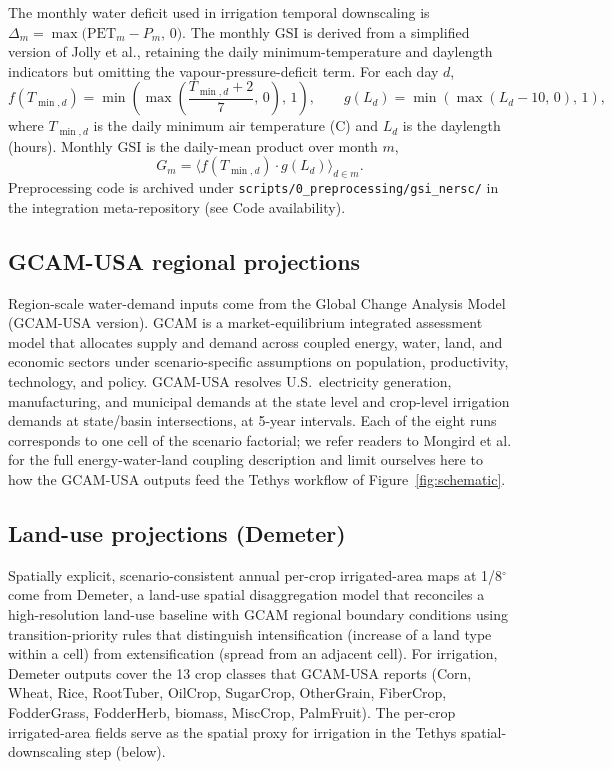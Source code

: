 \documentclass[fleqn,10pt]{wlscirep}
\begin{document}
The monthly water deficit used in irrigation temporal downscaling is $\Delta_m = \max\!\big(\text{PET}_m - P_m,\, 0\big)$. The monthly GSI is derived from a simplified version of Jolly et al.\cite{Jolly_2005}, retaining the daily minimum-temperature and daylength indicators but omitting the vapour-pressure-deficit term. For each day $d$,
\begin{equation}
f(T_{\min,d}) = \min\!\left(\max\!\left(\frac{T_{\min,d}+2}{7},\,0\right),\,1\right), \qquad
g(L_d) = \min\!\left(\max\!\left(L_d - 10,\,0\right),\,1\right),
\label{eq:gsi-components}
\end{equation}
where $T_{\min,d}$ is the daily minimum air temperature (\textdegree C) and $L_d$ is the daylength (hours). Monthly GSI is the daily-mean product over month $m$,
\begin{equation}
G_m = \big\langle f(T_{\min,d}) \cdot g(L_d) \big\rangle_{d \in m}.
\label{eq:gsi-monthly}
\end{equation}
Preprocessing code is archived under \texttt{scripts/0\_preprocessing/gsi\_nersc/} in the integration meta-repository (see Code availability).

\subsection*{GCAM-USA regional projections}

Region-scale water-demand inputs come from the Global Change Analysis Model (GCAM-USA version)\cite{Zhao_gcamusa_water,Zhao2024,Calvin2019GCAM,Binsted_2022}. GCAM is a market-equilibrium integrated assessment model that allocates supply and demand across coupled energy, water, land, and economic sectors under scenario-specific assumptions on population, productivity, technology, and policy. GCAM-USA resolves U.S.\ electricity generation, manufacturing, and municipal demands at the state level and crop-level irrigation demands at state/basin intersections, at 5-year intervals. Each of the eight runs corresponds to one cell of the scenario factorial; we refer readers to Mongird et al.\cite{Mongird2025CERF} for the full energy-water-land coupling description and limit ourselves here to how the GCAM-USA outputs feed the Tethys workflow of Figure~\ref{fig:schematic}.

\subsection*{Land-use projections (Demeter)}

Spatially explicit, scenario-consistent annual per-crop irrigated-area maps at 1/8$^{\circ}$ come from Demeter\cite{Vernon-2018}, a land-use spatial disaggregation model that reconciles a high-resolution land-use baseline with GCAM regional boundary conditions using transition-priority rules that distinguish intensification (increase of a land type within a cell) from extensification (spread from an adjacent cell). For irrigation, Demeter outputs cover the 13 crop classes that GCAM-USA reports (Corn, Wheat, Rice, RootTuber, OilCrop, SugarCrop, OtherGrain, FiberCrop, FodderGrass, FodderHerb, biomass, MiscCrop, PalmFruit). The per-crop irrigated-area fields serve as the spatial proxy for irrigation in the Tethys spatial-downscaling step (below).
\end{document}
